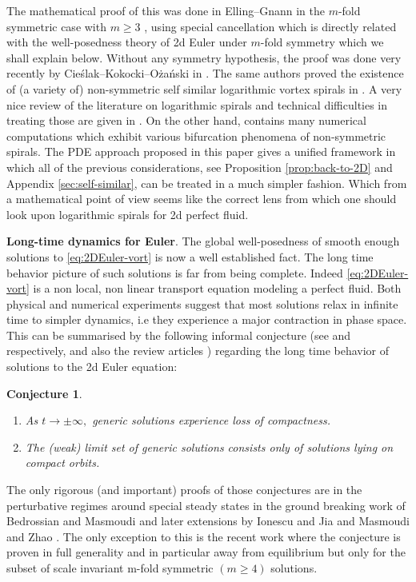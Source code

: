 \documentclass[10pt]{article}
\newtheorem{conjecture}[theorem]{Conjecture}
\theoremstyle{definition}
\theoremstyle{remark}
\numberwithin{equation}{section}
\newcommand{\0}{\emptyset}
\begin{document}
     The mathematical proof of this was done in Elling--Gnann in the $m$-fold symmetric case with $m\ge3$ \cite{Elling-Gnann}, using special cancellation which is directly related with the well-posedness theory of 2d Euler under $m$-fold symmetry which we shall explain below. Without any symmetry hypothesis, the proof was done very recently by Cie{\'s}lak--Kokocki--O{\.z}a{\'n}ski in \cite{CKW21}. The same authors proved the existence of (a variety of) non-symmetric self similar logarithmic vortex spirals in \cite{CKW22}. A very nice review of the literature on logarithmic spirals and technical difficulties in treating those are given in \cite{CKW21,CKW22}. On the other hand, \cite{Elling-Gnann} contains many numerical computations which exhibit various bifurcation phenomena of non-symmetric spirals. The PDE approach proposed in this paper gives a unified framework in which all of the previous considerations, see Proposition \ref{prop:back-to-2D} and Appendix \ref{sec:self-similar},  can be treated in a much simpler fashion. Which from a mathematical point of view seems like the correct lens from which one should look upon logarithmic spirals for 2d perfect fluid.

	
	\medskip 
	
	\noindent\textbf{Long-time dynamics for Euler}.
	The global well-posedness of smooth enough solutions to \eqref{eq:2DEuler-vort} is now a well established fact. The long time behavior picture of such solutions is far from being complete. Indeed \eqref{eq:2DEuler-vort} is a non local, non linear transport equation modeling a perfect fluid. Both physical and numerical experiments suggest that most solutions relax in infinite time to simpler dynamics, i.e they experience a major contraction in phase space. This can be summarised by the following informal conjecture (see \cite{Sverakcours} and \cite{Shnirelman} respectively, \cite{EMS} and also the review articles \cite{ED-review,Shnirelman-turvey}) regarding the long time behavior of solutions to the 2d Euler equation:
	\begin{conjecture}\label{conj:loss compactness and compact orbits}
		\begin{enumerate}
			\item As $t\rightarrow\pm\infty,$ generic solutions experience loss of compactness.
			\item The (weak) limit set of generic solutions consists only of solutions lying on compact orbits.
		\end{enumerate}
	\end{conjecture}
	\noindent The only rigorous (and important) proofs of those conjectures are in the perturbative regimes around special steady states in the ground breaking work of Bedrossian and Masmoudi \cite{BedrossianMasmoudi} and later extensions by Ionescu and Jia \cite{IonescuJia1,IonescuJia2} and Masmoudi and Zhao \cite{MasmoudiZhao}. The only exception to this is the recent work \cite{EMS} where the conjecture is proven in full generality and in particular away from equilibrium but only for the subset of scale invariant m-fold symmetric $(m\geq4)$ solutions.
\end{document}
